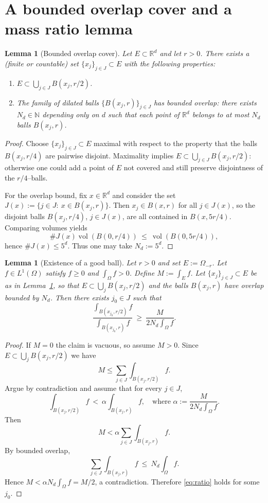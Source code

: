 \documentclass[12pt, reqno]{amsart}
\theoremstyle{plain}
\newtheorem{lem}[thm]{Lemma}
\theoremstyle{remark}
\newcommand{\R}{\mathbb{R}}
\newcommand{\N}{\mathbb{N}}
\newcommand{\vol}{\operatorname{vol}}
\begin{document}
\section{A bounded overlap cover and a mass ratio lemma}

\begin{lem}[Bounded overlap cover]\label{lem:cover}
Let $E\subset\R^d$ and let $r>0$.
There exists a (finite or countable) set $\{x_j\}_{j\in J}\subset E$ with the following properties:
\begin{enumerate}
\item $E\subset \bigcup_{j\in J} B(x_j,r/2)$.
\item The family of dilated balls $\{B(x_j,r)\}_{j\in J}$ has bounded overlap: there exists $N_d\in\N$ depending only on $d$ such that each point of $\R^d$ belongs to at most $N_d$ balls $B(x_j,r)$.
\end{enumerate}
\end{lem}

\begin{proof}
Choose $\{x_j\}_{j\in J}\subset E$ maximal with respect to the property that the balls $B(x_j,r/4)$ are pairwise disjoint.
Maximality implies $E\subset\bigcup_{j\in J}B(x_j,r/2)$: otherwise one could add a point of $E$ not covered and still preserve disjointness of the $r/4$--balls.

For the overlap bound, fix $x\in\R^d$ and consider the set $J(x) := \{j\in J:\ x\in B(x_j,r)\}$.
Then $x_j\in B(x,r)$ for all $j\in J(x)$, so the disjoint balls $B(x_j,r/4)$, $j\in J(x)$, are all contained in $B(x,5r/4)$.
Comparing volumes yields
$$
\#J(x) \vol(B(0,r/4))\ \le\ \vol(B(0,5r/4)),
$$
hence $\#J(x)\le 5^d$.
Thus one may take $N_d := 5^d$.
\end{proof}

\begin{lem}[Existence of a good ball]\label{lem:good-ball}
Let $r>0$ and set $E := \Omega_{-r}$.
Let $f\in L^1(\Omega)$ satisfy $f\ge 0$ and $\int_\Omega f>0$.
Define $M := \int_E f$.
Let $\{x_j\}_{j\in J}\subset E$ be as in Lemma~\ref{lem:cover}, so that $E\subset \bigcup_{j} B(x_j,r/2)$ and the balls $B(x_j,r)$ have overlap bounded by $N_d$.
Then there exists $j_0\in J$ such that
\begin{equation}\label{eq:ratio}
\frac{\int_{B(x_{j_0},r/2)} f}{\int_{B(x_{j_0},r)} f}
\ \ge\
\frac{M}{2N_d \int_\Omega f}.
\end{equation}
\end{lem}

\begin{proof}
If $M = 0$ the claim is vacuous, so assume $M>0$.
Since $E\subset\bigcup_j B(x_j,r/2)$ we have
$$
M\le \sum_{j\in J}\int_{B(x_j,r/2)} f.
$$
Argue by contradiction and assume that for every $j\in J$,
$$
\int_{B(x_j,r/2)} f\ <\ \alpha \int_{B(x_j,r)} f,
\quad\text{where }\alpha := \frac{M}{2N_d \int_\Omega f}.
$$
Then
$$
M
< \alpha \sum_{j\in J}\int_{B(x_j,r)} f.
$$
By bounded overlap,
$$
\sum_{j\in J}\int_{B(x_j,r)} f\ \le\ N_d\int_\Omega f.
$$
Hence $M<\alpha N_d\int_\Omega f = M/2$, a contradiction. Therefore \eqref{eq:ratio} holds for some $j_0$.
\end{proof}
\end{document}
